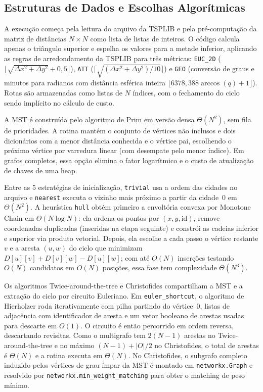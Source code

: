 \documentclass[12pt]{article}
\begin{document}
\subsection{Estruturas de Dados e Escolhas Algorítmicas}

A execução começa pela leitura do arquivo da TSPLIB e pela pré-computação da matriz de distâncias $N \times N$ como lista de listas de inteiros. O código calcula apenas o triângulo superior e espelha os valores para a metade inferior, aplicando as regras de arredondamento da TSPLIB para três métricas: \texttt{EUC\_2D} ($\lfloor \sqrt{\Delta x^2 + \Delta y^2} + 0{,}5 \rfloor$), \texttt{ATT} ($\lceil \sqrt{(\Delta x^2 + \Delta y^2)/10} \rceil$) e \texttt{GEO} (conversão de graus e minutos para radianos com distância esférica inteira $\lfloor 6378{,}388 \arccos(q) + 1 \rfloor$). Rotas são armazenadas como listas de $N$ índices, com o fechamento do ciclo sendo implícito no cálculo de custo.

A MST é construída pelo algoritmo de Prim em versão densa $\Theta(N^2)$, sem fila de prioridades. A rotina mantém o conjunto de vértices não inclusos e dois dicionários com a menor distância conhecida e o vértice pai, escolhendo o próximo vértice por varredura linear (com desempate pelo menor índice). Em grafos completos, essa opção elimina o fator logarítmico e o custo de atualização de chaves de uma heap.

Entre as 5 estratégias de inicialização, \texttt{trivial} usa a ordem das cidades no arquivo e \texttt{nearest} executa o vizinho mais próximo a partir da cidade~0 em $\Theta(N^2)$. A heurística \texttt{hull} obtém primeiro a envoltória convexa por Monotone Chain em $\Theta(N \log N)$: ela ordena os pontos por $(x, y, \mathrm{id})$, remove coordenadas duplicadas (inseridas na etapa seguinte) e constrói as cadeias inferior e superior via produto vetorial. Depois, ela escolhe a cada passo o vértice restante $v$ e a aresta $(u, w)$ do ciclo que minimizam $D[u][v] + D[v][w] - D[u][w]$; com até $O(N)$ inserções testando $O(N)$ candidatos em $O(N)$ posições, essa fase tem complexidade $\Theta(N^3)$.

Os algoritmos Twice-around-the-tree e Christofides compartilham a MST e a extração do ciclo por circuito Euleriano. Em \texttt{euler\_shortcut}, o algoritmo de Hierholzer roda iterativamente com pilha partindo do vértice~0, listas de adjacência com identificador de aresta e um vetor booleano de arestas usadas para descarte em $O(1)$. O circuito é então percorrido em ordem reversa, descartando revisitas. Como o multigrafo tem $2(N-1)$ arestas no Twice-around-the-tree e no máximo $(N-1) + |O|/2$ no Christofides, o total de arestas é $\Theta(N)$ e a rotina executa em $\Theta(N)$. No Christofides, o subgrafo completo induzido pelos vértices de grau ímpar da MST é montado em \texttt{networkx.Graph} e resolvido por \texttt{networkx.min\_weight\_matching} para obter o matching de peso mínimo.
\end{document}
